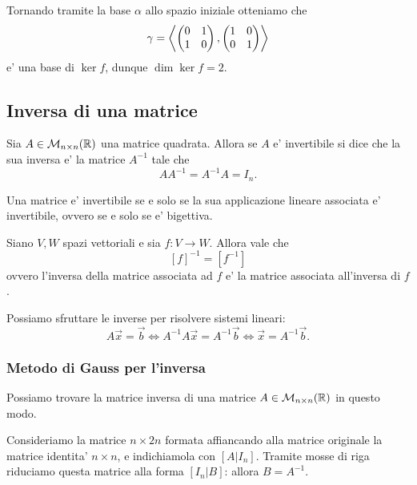 \begin{solution}
\begin{enumerate}
        Tornando tramite la base $\alpha$ allo spazio iniziale otteniamo che \[
            \gamma = \left\langle \begin{pmatrix} 0 & 1 \\ 1 & 0 \end{pmatrix}, \begin{pmatrix} 1 & 0 \\ 0 & 1 \end{pmatrix} \right\rangle  
        \] e' una base di $\ker f$, dunque $\dim \ker f = 2$.
    \end{enumerate}
\end{solution}

\subsection{Inversa di una matrice}

\begin{definition}
    Sia $A \in \mathcal{M}_{n \times n}(\mathbb{R})$ una matrice quadrata. Allora se $A$ e' invertibile si dice che la sua inversa e' la matrice $A^{-1}$ tale che \[
        AA^{-1} = A^{-1}A = I_n.
    \]
\end{definition}

Una matrice e' invertibile se e solo se la sua applicazione lineare associata e' invertibile, ovvero se e solo se e' bigettiva.

\begin{proposition}
    Siano $V, W$ spazi vettoriali e sia $f : V \to W$. Allora vale che \[
        [f]^{-1} = [f^{-1}]    
    \] ovvero l'inversa della matrice associata ad $f$ e' la matrice associata all'inversa di $f$.
\end{proposition}

Possiamo sfruttare le inverse per risolvere sistemi lineari: \[
    A\vec x = \vec b \iff A^{-1}A\vec x = A^{-1}\vec b \iff \vec x = A^{-1}\vec b.
\]

\subsubsection{Metodo di Gauss per l'inversa}
Possiamo trovare la matrice inversa di una matrice $A \in  \mathcal{M}_{n \times n}(\mathbb{R})$ in questo modo. 

Consideriamo la matrice $n \times 2n$ formata affiancando alla matrice originale la matrice identita' $n \times n$, e indichiamola con $[A | I_n]$. Tramite mosse di riga riduciamo questa matrice alla forma $[I_n | B]$: allora $B = A^{-1}$.

